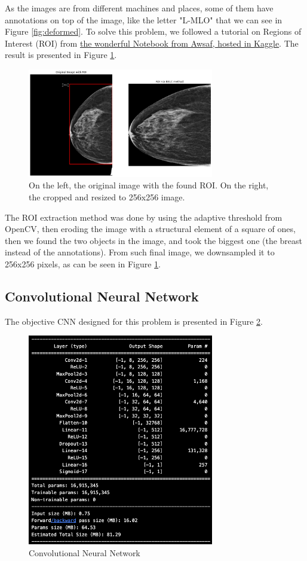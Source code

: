 \documentclass[conference]{IEEEtran}
\begin{document}
As the images are from different machines and places, some of them have annotations on top of the image, like the letter "L-MLO" that we can see in Figure \ref{fig:deformed}. To solve this problem, we followed a tutorial on Regions of Interest (ROI) from \href{https://www.kaggle.com/code/awsaf49/rsna-bcd-roi-methods-comparison}{the wonderful Notebook from Awsaf, hosted in Kaggle}. The result is presented in Figure \ref{fig:roi_belc}.

\begin{figure}[ht]
\centering
\includegraphics[width=3.2in]{ROI_based}
\caption{On the left, the original image with the found ROI. On the right, the cropped and resized to 256x256 image.}
\label{fig:roi_belc}
\end{figure}

The ROI extraction method was done by using the adaptive threshold from OpenCV, then eroding the image with a structural element of a square of ones, then we found the two objects in the image, and took the biggest one (the breast instead of the annotations). From such final image, we downsampled it to 256x256 pixels, as can be seen in Figure \ref{fig:roi_belc}.
\subsection{Convolutional Neural Network}

The objective CNN designed for this problem is presented in Figure \ref{fig:CNN}.

\begin{figure}[ht]
\centering
\includegraphics[width=3.2in]{CNN}
\caption{Convolutional Neural Network}
\label{fig:CNN}


\end{figure}
\end{document}
